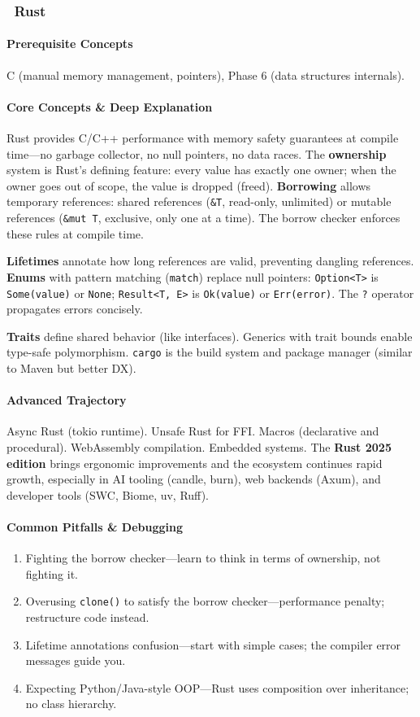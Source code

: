 \documentclass[11pt, a4paper, oneside]{report}
\newcommand{\mustmaster}[1]{\subsubsection{\texorpdfstring{\fcolorbox{blue!40!black}{blue!8}{\footnotesize\bfseries\color{blue!40!black} MUST MASTER}~#1}{#1}}}
\begin{document}
\mustmaster{Rust}

\paragraph{Prerequisite Concepts} C (manual memory management, pointers), Phase 6 (data structures internals).

\paragraph{Core Concepts \& Deep Explanation} Rust provides C/C++ performance with memory safety guarantees at compile time---no garbage collector, no null pointers, no data races. The \textbf{ownership} system is Rust's defining feature: every value has exactly one owner; when the owner goes out of scope, the value is dropped (freed). \textbf{Borrowing} allows temporary references: shared references (\texttt{\&T}, read-only, unlimited) or mutable references (\texttt{\&mut T}, exclusive, only one at a time). The borrow checker enforces these rules at compile time.

\textbf{Lifetimes} annotate how long references are valid, preventing dangling references. \textbf{Enums} with pattern matching (\texttt{match}) replace null pointers: \texttt{Option<T>} is \texttt{Some(value)} or \texttt{None}; \texttt{Result<T, E>} is \texttt{Ok(value)} or \texttt{Err(error)}. The \texttt{?} operator propagates errors concisely.

\textbf{Traits} define shared behavior (like interfaces). Generics with trait bounds enable type-safe polymorphism. \texttt{cargo} is the build system and package manager (similar to Maven but better DX).

\paragraph{Advanced Trajectory} Async Rust (tokio runtime). Unsafe Rust for FFI. Macros (declarative and procedural). WebAssembly compilation. Embedded systems. The \textbf{Rust 2025 edition} brings ergonomic improvements and the ecosystem continues rapid growth, especially in AI tooling (candle, burn), web backends (Axum), and developer tools (SWC, Biome, uv, Ruff).

\paragraph{Common Pitfalls \& Debugging}
\begin{enumerate}[leftmargin=*]
\item Fighting the borrow checker---learn to think in terms of ownership, not fighting it.
\item Overusing \texttt{clone()} to satisfy the borrow checker---performance penalty; restructure code instead.
\item Lifetime annotations confusion---start with simple cases; the compiler error messages guide you.
\item Expecting Python/Java-style OOP---Rust uses composition over inheritance; no class hierarchy.
\end{enumerate}
\end{document}
